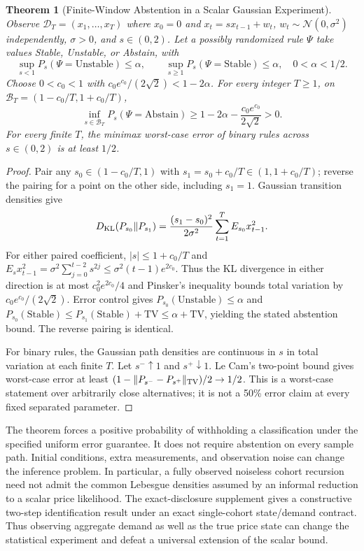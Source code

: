 \documentclass[12pt]{article}
\newtheorem{theorem}{Theorem}[section]
\theoremstyle{definition}
\theoremstyle{remark}
\begin{document}
\begin{theorem}[Finite-Window Abstention in a Scalar Gaussian Experiment]
\label{thm:m3_minimax_abstention}
Observe $\mathcal D_T=(x_1,\ldots,x_T)$ where $x_0=0$ and $x_t=sx_{t-1}+w_t$, $w_t\sim\mathcal N(0,\sigma^2)$ independently, $\sigma>0$, and $s\in(0,2)$. Let a possibly randomized rule $\Psi$ take values Stable, Unstable, or Abstain, with
\[
\sup_{s<1}P_s(\Psi=\mathrm{Unstable})\le\alpha,
\qquad \sup_{s\ge1}P_s(\Psi=\mathrm{Stable})\le\alpha,
\quad 0<\alpha<1/2.
\]
Choose $0<c_0<1$ with $c_0e^{c_0}/(2\sqrt2)<1-2\alpha$. For every integer $T\ge1$, on $\mathcal B_T=(1-c_0/T,1+c_0/T)$,
\begin{equation}
\inf_{s\in\mathcal B_T}P_s(\Psi=\mathrm{Abstain})
\ge1-2\alpha-\frac{c_0e^{c_0}}{2\sqrt2}>0.
\label{eq:abstain_bound}
\end{equation}
For every finite $T$, the minimax worst-case error of binary rules across $s\in(0,2)$ is at least $1/2$.
\end{theorem}
\begin{proof}
Pair any $s_0\in(1-c_0/T,1)$ with $s_1=s_0+c_0/T\in(1,1+c_0/T)$; reverse the pairing for a point on the other side, including $s_1=1$. Gaussian transition densities give
\[
D_{\rm KL}(P_{s_0}\|P_{s_1})
=\frac{(s_1-s_0)^2}{2\sigma^2}\sum_{t=1}^T E_{s_0}x_{t-1}^2.
\]
For either paired coefficient, $|s|\le1+c_0/T$ and
$E_sx_{t-1}^2=\sigma^2\sum_{j=0}^{t-2}s^{2j}\le\sigma^2(t-1)e^{2c_0}$.
Thus the KL divergence in either direction is at most $c_0^2e^{2c_0}/4$ and Pinsker's inequality bounds total variation by $c_0e^{c_0}/(2\sqrt2)$. Error control gives $P_{s_0}(\mathrm{Unstable})\le\alpha$ and $P_{s_0}(\mathrm{Stable})\le P_{s_1}(\mathrm{Stable})+\mathrm{TV}\le\alpha+\mathrm{TV}$, yielding the stated abstention bound. The reverse pairing is identical.

For binary rules, the Gaussian path densities are continuous in $s$ in total variation at each finite $T$. Let $s^-\uparrow1$ and $s^+\downarrow1$. Le Cam's two-point bound gives worst-case error at least $(1-\|P_{s^-}-P_{s^+}\|_{\rm TV})/2\to1/2$. This is a worst-case statement over arbitrarily close alternatives; it is not a 50\% error claim at every fixed separated parameter.
\end{proof}

The theorem forces a positive probability of withholding a classification under the specified uniform error guarantee. It does not require abstention on every sample path. Initial conditions, extra measurements, and observation noise can change the inference problem. In particular, a fully observed noiseless cohort recursion need not admit the common Lebesgue densities assumed by an informal reduction to a scalar price likelihood. The exact-disclosure supplement gives a constructive two-step identification result under an exact single-cohort state/demand contract. Thus observing aggregate demand as well as the true price state can change the statistical experiment and defeat a universal extension of the scalar bound.
\end{document}

